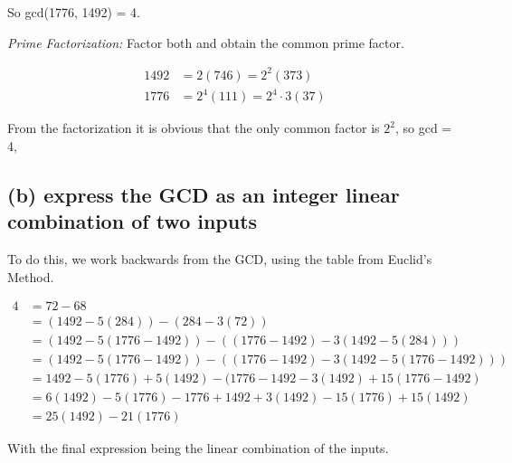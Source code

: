 \documentclass{article}
\begin{document}
So gcd(1776, 1492) = 4.

\noindent\textit{Prime Factorization:} Factor both and obtain the common prime factor.

\begin{align*}
  1492 &= 2(746) = 2^2 (373) \\
  1776 &= 2^4 (111) = 2^4 \cdot 3 (37)
\end{align*}

From the factorization it is obvious that the only common factor is $2^2$, so gcd = 4,

\subsection*{(b) \normalsize express the GCD as an integer linear combination of two inputs}

To do this, we work backwards from the GCD, using the table from Euclid's Method.

\begin{align*}
  4 &= 72 - 68 \\
  &= (1492 - 5(284)) - (284 - 3(72)) \\
  &= (1492 - 5(1776 - 1492)) - ((1776-1492) - 3(1492 - 5(284))) \\
  &= (1492 - 5(1776 - 1492)) - ((1776-1492) - 3(1492 - 5(1776 - 1492)))\\
  &= 1492 - 5(1776) + 5(1492) - (1776 - 1492 - 3(1492) + 15(1776 - 1492) \\
  &= 6(1492) - 5(1776) - 1776 + 1492 + 3(1492) - 15(1776) + 15(1492) \\
  &= 25(1492) - 21(1776)
\end{align*}

With the final expression being the linear combination of the inputs.
\end{document}
